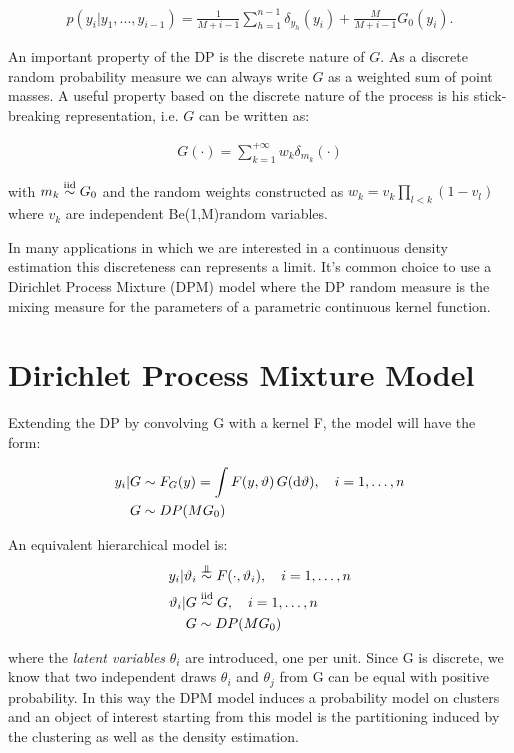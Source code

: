 \begin{align}
	p(y_i|y_1,...,y_{i-1})= \frac{1}{M+i-1}\sum_{h=1}^{n-1} \delta_{y_h}(y_i) +\frac{M}{M+i-1} G_0(y_i).
\end{align}

An important property of the DP is the discrete nature of $G$. As a discrete
random probability measure we can always write $G$ as a weighted sum of point masses.
A useful  property based on the discrete nature of the process is his stick-breaking representation, i.e. $G$ can be written as:

\begin{align}
 G(\cdot) = \sum_{k=1}^{+\infty} w_k \delta_{m_k} (\cdot)
 \end{align}
 
 with $m_k \stackrel{\text{iid}}{\sim} G_0$ and the random weights constructed as $w_k =v_k\prod\limits_{l<k} (1-v_l)$ where $v_k$ are independent Be(1,M)random variables.




In many applications in which we are interested in a continuous density estimation this discreteness can represents a limit.
 It's common choice to use a Dirichlet Process Mixture (DPM) model where  the DP random measure is the mixing measure for the parameters of a parametric continuous kernel function.


\section{Dirichlet Process Mixture Model}

Extending the DP by convolving G with a kernel F, the model will have the form:

\begin{align*}
			y_i | G &\sim F_G(y) = \int F(y,\vartheta) \, G(\mathrm d\vartheta), \quad i=1,\dots,n \\
			G &\sim DP(M G_0)
\end{align*}


An equivalent hierarchical model is:
\begin{align*}
			y_i | \theta_i &\indsim F(\cdot,\theta_i), \quad i=1,\dots,n \\
			\theta_i | G &\iidsim G, \quad i=1,\dots,n \\
			G &\sim DP(M G_0)
\end{align*}

where the \textit{latent variables} $\theta_i$ are introduced, one per unit. Since G is discrete, we know that two independent draws $\theta_i$ and $\theta_j$ from G can be equal with positive probability. In this way the DPM model induces a probability model on clusters and an object of interest starting from this model is the partitioning induced by the clustering as well as the density estimation. 


